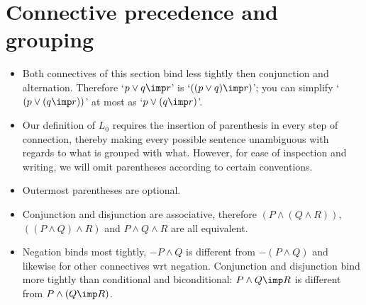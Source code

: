 \documentclass[11pt]{article}
\begin{document}
\section{Connective precedence and grouping}

\begin{itemize}

\item Both connectives of this section bind less tightly then conjunction and
alternation. Therefore `$p\lor q\imp r$' is `$((p\lor q) \imp r)$'; you can
simplify `$(p\lor(q\imp r))$' at most as `$p\lor(q\imp r)$'.
 
\end{itemize}

\begin{itemize}

\item Our definition of $L_0$ requires the insertion of parenthesis in every step
of connection, thereby making every possible sentence unambiguous with regards to
what is grouped with what. However, for ease of inspection and writing, we will
omit parentheses according to certain conventions. 

\item Outermost parentheses are optional. 

\item Conjunction and disjunction are associative, therefore $(P\land (Q\land
R))$, $((P\land Q)\land R)$ and $P\land Q\land R$ are all equivalent.

\item Negation binds most tightly, $-P\land Q$ is different from $-(P\land Q)$
and likewise for other connectives wrt negation. Conjunction and disjunction
bind more tightly than conditional and biconditional: $P\land Q \imp R$  is
different from $P\land (Q\imp R)$.

% 
% 
\end{itemize}
\end{document}
